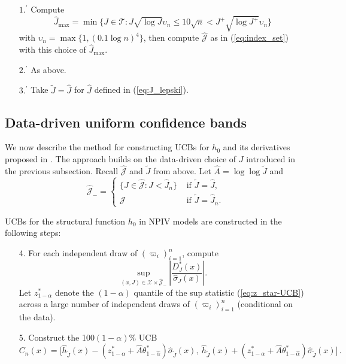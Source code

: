 \documentclass[
]{jss}
\begin{document}
\begin{enumerate}
\item[$1.^{\prime}$] Compute
\begin{equation} \label{eq:J_hat_max_regression}
 \hat{J}_{\max} = \min \bigg \{ J \in \mathcal T :   J \sqrt{\log J} \upsilon_n \leq 10 \sqrt n <  J^{+} \sqrt{\log J^{+}} \upsilon_n  \bigg \}
\end{equation}
with $\upsilon_n = \max\{1, (0.1 \log n)^4\}$, then compute $\hat{\mathcal J}$ as in (\ref{eq:index_set}) with this choice of $\hat J_{\max}$.
\item[$2.^{\prime}$] As above.
\item[$3.^{\prime}$] Take $\tilde J = \hat J$ for $\hat J$ defined in (\ref{eq:J_lepski}).
\end{enumerate}

\subsection{Data-driven uniform confidence
bands}\label{data-driven-uniform-confidence-bands}

We now describe the method for constructing UCBs for \(h_0\) and its
derivatives proposed in \citet{CCK}. The approach builds on the
data-driven choice of \(J\) introduced in the previous subsection.
Recall \(\hat{\mathcal J}\) and \(\tilde J\) from above. Let
\(\hat A = \log \log \tilde J\) and \[
 \hat{\mathcal J}_{-} =
 \begin{cases}
 \{J \in \hat{\mathcal J} : J < \hat J_n\} & \mbox{~if $\tilde J = \hat J$}, \\
 \hat{\mathcal J} & \mbox{~if $\tilde J = \hat J_n$}.
 \end{cases}
\]

UCBs for the structural function \(h_0\) in NPIV models are constructed
in the following steps:

\begin{enumerate}
\item[4.] For each independent draw of $(\varpi_i)_{i=1}^n$, compute
\begin{equation} \label{eq:z_star-UCB}
 \sup_{(x,J) \in \mathcal{X} \times \hat{\mathcal J}_{-}} \left| \frac{D_J^*(x)}{\hat \sigma_J(x)} \right|.
\end{equation}
Let $z_{1-\alpha}^*$ denote the $(1-\alpha )$ quantile of the sup statistic (\ref{eq:z_star-UCB}) across a large number of independent draws of $(\varpi_i)_{i=1}^n$ (conditional on the data).
\item[5.] Construct the 100$(1-\alpha)$\% UCB
\begin{equation} \label{band}
 C_n(x) = \bigg[ \hat{h}_{\tilde{J}}(x) - \left( z_{1-\alpha}^* + \hat A \theta^*_{1-\hat \alpha}  \right ) \hat \sigma_{\tilde J}(x) , ~  \hat{h}_{\tilde{J}}(x) + \left( z_{1-\alpha}^* + \hat A \theta^*_{1-\hat \alpha}  \right) \hat \sigma_{\tilde J}(x) \bigg] \,.
\end{equation}
\end{enumerate}
\end{document}
